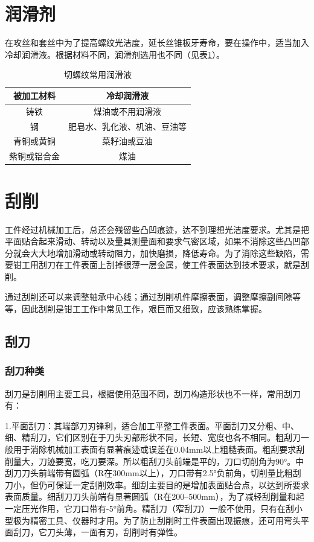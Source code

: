 \documentclass{ctexbook}
\begin{document}
\section{润滑剂}
在攻丝和套丝中为了提高螺纹光洁度，延长丝锥板牙寿命，要在操作中，适当加入冷却润滑液。根据材料不同，润滑剂选用也不同（见表\ref{tab:qieluowen}）。

\begin{table}[htbp]
	\centering
	\caption{切螺纹常用润滑液}
	\begin{tabular}{c|c}
		 \hline
		被加工材料 & 冷却润滑液 \\ \hline
		铸铁    & 煤油或不用润滑液 \\ \hline
		钢     & 肥皂水、乳化液、机油、豆油等 \\ \hline
		青铜或黄铜 & 菜籽油或豆油 \\ \hline
		紫铜或铝合金 & 煤油 \\ \hline
	\end{tabular}%
	\label{tab:qieluowen}%
\end{table}%
\section{刮削}
工件经过机械加工后，总还会残留些凸凹痕迹，达不到理想光洁度要求。尤其是把平面贴合起来滑动、转动以及量具测量面和要求气密区域，如果不消除这些凸凹部分就会大大地增加滑动或转动阻力，加快磨损，降低寿命。为了消除这些缺陷，需要钳工用刮刀在工件表面上刮掉很薄一层金属，使工件表面达到技术要求，就是刮削。

通过刮削还可以来调整轴承中心线；通过刮削机件摩擦表面，调整摩擦副间隙等等，因此刮削是钳工工作中常见工作，艰巨而又细致，应该熟练掌握。
\subsection{刮刀}
\subsubsection{刮刀种类}
刮刀是刮削用主要工具，根据使用范围不同，刮刀构造形状也不一样，常用刮刀有：

1.平面刮刀：其端部刀刃锋利，适合加工平整工件表面。平面刮刀又分粗、中、细、精刮刀，它们区别在于刀头刃部形状不同，长短、宽度也各不相同。粗刮刀一般用于消除机械加工表面有显著痕迹或误差在0.04mm以上粗糙表面。粗刮要求刮削量大，刀迹要宽，吃刀要深。所以粗刮刀头前端是平的，刀口切削角为90°。中刮刀刀头前端带有圆弧（R在300mm以上），刀口带有2.5°负前角，切削量比粗刮刀小，但仍可保证一定刮削效率。细刮主要目的是增加表面贴合点，以达到所要求表面质量。细刮刀刀头前端有显著圆弧（R在200--500mm），为了减轻刮削量和起一定压光作用，它刀口带有-5°前角。精刮刀（窄刮刀）一般不使用，只有在刮小型极为精密工具、仪器时才用。为了防止刮削时工件表面出现振痕，还可用弯头平面刮刀，它刀头薄，一面有刃，刮削时有弹性。
\end{document}
